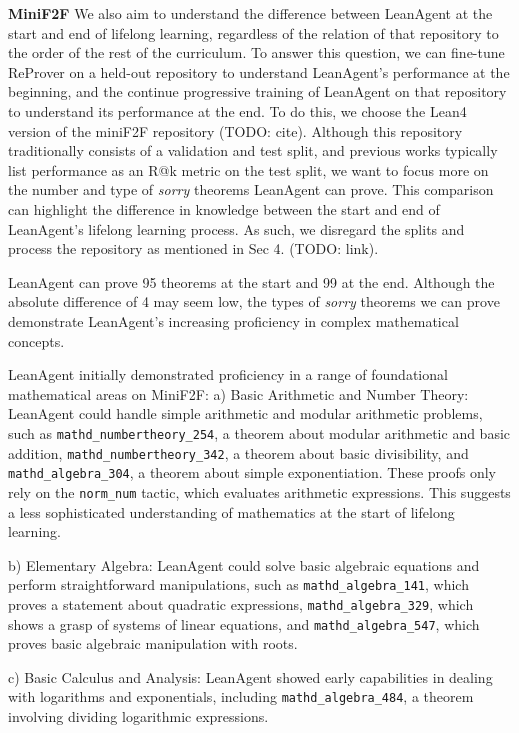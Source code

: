 \documentclass{article} %
\begin{document}
\textbf{MiniF2F} We also aim to understand the difference between LeanAgent at the start and end of lifelong learning, regardless of the relation of that repository to the order of the rest of the curriculum. To answer this question, we can fine-tune ReProver on a held-out repository to understand LeanAgent's performance at the beginning, and the continue progressive training of LeanAgent on that repository to understand its performance at the end. To do this, we choose the Lean4 version of the miniF2F repository (TODO: cite). Although this repository traditionally consists of a validation and test split, and previous works typically list performance as an R@k metric on the test split, we want to focus more on the number and type of \textit{sorry} theorems LeanAgent can prove. This comparison can highlight the difference in knowledge between the start and end of LeanAgent's lifelong learning process. As such, we disregard the splits and process the repository as mentioned in Sec 4. (TODO: link).

LeanAgent can prove 95 theorems at the start and 99 at the end. Although the absolute difference of 4 may seem low, the types of \textit{sorry} theorems we can prove demonstrate LeanAgent's increasing proficiency in complex mathematical concepts.

LeanAgent initially demonstrated proficiency in a range of foundational mathematical areas on MiniF2F:
a) Basic Arithmetic and Number Theory:
LeanAgent could handle simple arithmetic and modular arithmetic problems, such as \texttt{mathd\_numbertheory\_254}, a theorem about modular arithmetic and basic addition, \texttt{mathd\_numbertheory\_342}, a theorem about basic divisibility, and \texttt{mathd\_algebra\_304}, a theorem about simple exponentiation. These proofs only rely on the \texttt{norm\_num} tactic, which evaluates arithmetic expressions. This suggests a less sophisticated understanding of mathematics at the start of lifelong learning.

b) Elementary Algebra:
LeanAgent could solve basic algebraic equations and perform straightforward manipulations, such as \texttt{mathd\_algebra\_141}, which proves a statement about quadratic expressions, \texttt{mathd\_algebra\_329}, which shows a grasp of systems of linear equations, and \texttt{mathd\_algebra\_547}, which proves basic algebraic manipulation with roots.

c) Basic Calculus and Analysis:
LeanAgent showed early capabilities in dealing with logarithms and exponentials, including \texttt{mathd\_algebra\_484}, a theorem involving dividing logarithmic expressions.
\end{document}
